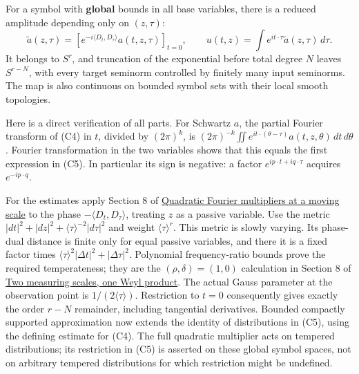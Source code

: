 \documentclass[
  11pt,
]{article}
\begin{document}
For a symbol with \textbf{global} bounds in all base variables, there is
a reduced amplitude depending only on \((z,\tau)\): \[
\widetilde a(z,\tau)
=\left[e^{-i\langle D_t,D_\tau\rangle}a(t,z,\tau)\right]_{t=0},
\qquad u(t,z)=\int e^{it\cdot\tau}\widetilde a(z,\tau)\,d\tau.
\tag{C5}
\] It belongs to \(S^r\), and truncation of the exponential before total
degree \(N\) leaves \(S^{r-N}\), with every target seminorm controlled
by finitely many input seminorms. The map is also continuous on bounded
symbol sets with their local smooth topologies.

Here is a direct verification of all parts. For Schwartz \(a\), the
partial Fourier transform of (C4) in \(t\), divided by \((2\pi)^k\), is
\((2\pi)^{-k}\iint e^{it\cdot(\theta-\tau)}a(t,z,\theta)\,dt\,d\theta\).
Fourier transformation in the two variables shows that this equals the
first expression in (C5). In particular its sign is negative: a factor
\(e^{ip\cdot t+iq\cdot\tau}\) acquires \(e^{-ip\cdot q}\).

For the estimates apply Section 8 of
\href{gauss-transform-estimates.pdf}{Quadratic Fourier multipliers at a
moving scale} to the phase \(-\langle D_t,D_\tau\rangle\), treating
\(z\) as a passive variable. Use the metric
\(|dt|^2+|dz|^2+\langle\tau\rangle^{-2}|d\tau|^2\) and weight
\(\langle\tau\rangle^r\). This metric is slowly varying. Its phase-dual
distance is finite only for equal passive variables, and there it is a
fixed factor times \(\langle\tau\rangle^2|\Delta t|^2+|\Delta\tau|^2\).
Polynomial frequency-ratio bounds prove the required temperateness; they
are the \((\rho,\delta)=(1,0)\) calculation in Section 8 of
\href{weyl-metric-products.pdf}{Two measuring scales, one Weyl product}.
The actual Gauss parameter at the observation point is
\(1/(2\langle\tau\rangle)\). Restriction to \(t=0\) consequently gives
exactly the order \(r-N\) remainder, including tangential derivatives.
Bounded compactly supported approximation now extends the identity of
distributions in (C5), using the defining estimate for (C4). The full
quadratic multiplier acts on tempered distributions; its restriction in
(C5) is asserted on these global symbol spaces, not on arbitrary
tempered distributions for which restriction might be undefined.
\end{document}
